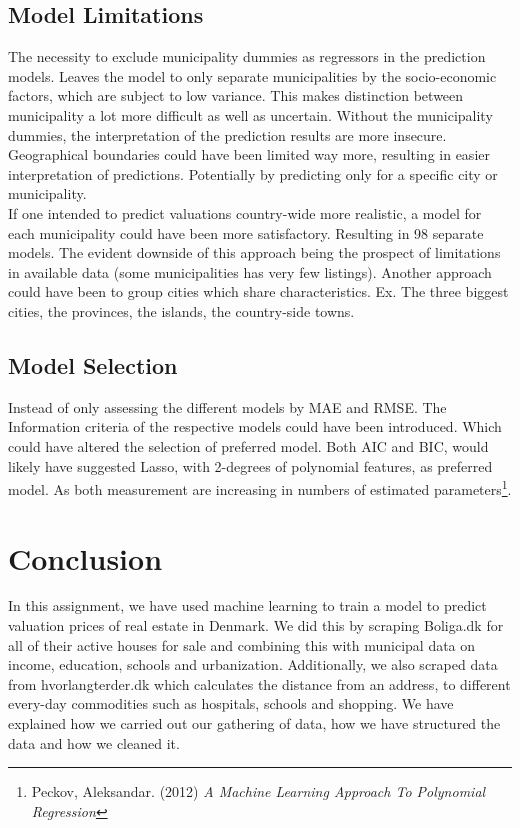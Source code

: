 \documentclass[12pt,a4paper]{article}
\begin{document}
\subsection{Model Limitations}
The necessity to exclude municipality dummies as regressors in the prediction models. Leaves the model to only separate municipalities by the socio-economic factors, which are subject to low variance. This makes distinction between municipality a lot more difficult as well as uncertain.   
Without the municipality dummies, the interpretation of the prediction results are more insecure. %
Geographical boundaries could have been limited way more, resulting in easier interpretation of predictions. Potentially by predicting only for a specific city or municipality. \\
If one intended to predict valuations country-wide more realistic, a model for each municipality could have been more satisfactory. Resulting in 98 separate models. The evident downside of this approach being the prospect of limitations in available data (some municipalities has very few listings).     
Another approach could have been to group cities which share characteristics. Ex. The three biggest cities, the provinces, the islands, the country-side towns.    

\subsection{Model Selection}
Instead of only assessing the different models by MAE and RMSE.
The Information criteria of the respective models could have been introduced. Which could have altered the selection of preferred model. Both AIC and BIC, would likely have suggested Lasso, with 2-degrees of polynomial features, as preferred model. As both measurement are increasing in numbers of estimated parameters\footnote{Peckov, Aleksandar. (2012)  \textit{A Machine Learning Approach To Polynomial Regression}}. 

\section{Conclusion}
In this assignment, we have used machine learning to train a model to predict valuation prices of real estate in Denmark. We did this by scraping Boliga.dk for all of their active houses for sale and combining this with municipal data on income, education, schools and urbanization. Additionally, we also scraped data from hvorlangterder.dk which calculates the distance from an address, to different every-day commodities such as hospitals, schools and shopping. 
We have explained how we carried out our gathering of data, how we have structured the data and how we cleaned it. 
\end{document}
